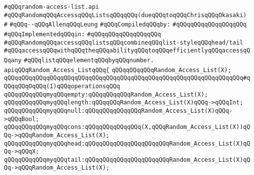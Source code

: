 \label{src/lib/src/random-access-list.api}
\verb|#qQQqrandom-access-list.api|\newline
\verb|#qQQqRandomqQQqAccessqQQqListsqQQqqQQq(dueqQQqtoqQQqChrisqQQqOkasaki)|\newline
\verb|#|\newline
\verb|#qQQq--qQQqAllenqQQqLeung|\newline
\newline
\verb|#qQQqCompiledqQQqby:|\newline
\verb|#qQQqqQQqqQQqqQQqqQQq|\newline
\newline
\verb|#qQQqImplementedqQQqin:|\newline
\verb|#qQQqqQQqqQQqqQQqqQQq|\newline
\newline
\verb|#qQQqRandomqQQqaccessqQQqlistsqQQqcombineqQQqlist-styleqQQqhead/tail|\newline
\verb|#qQQqaccessqQQqwithqQQqtheqQQqabilityqQQqtoqQQqefficientlyqQQqaccessqQQqany|\newline
\verb|#qQQqlistqQQqelementqQQqbyqQQqnumber.|\newline
\newline
\newline
\verb|apiqQQqRandom_Access_ListqQQq{|\newline
\newline
\verb|qQQqqQQqqQQqRandom_Access_List(X);|\newline
\newline
\verb|qQQqqQQqqQQqqQQqqQQqqQQqqQQqqQQqqQQqqQQqqQQqqQQqqQQqqQQqqQQqqQQqqQQq#qQQqqQQqOqQQq(1)qQQqoperationsqQQq|\newline
\verb|qQQqqQQqqQQqmyqQQqempty:qQQqqQQqqQQqRandom_Access_List(X);|\newline
\verb|qQQqqQQqqQQqmyqQQqlength:qQQqqQQqRandom_Access_List(X)qQQq->qQQqInt;|\newline
\verb|qQQqqQQqqQQqmyqQQqnull:qQQqqQQqqQQqqQQqRandom_Access_List(X)qQQq->qQQqBool;|\newline
\verb|qQQqqQQqqQQqmyqQQqcons:qQQqqQQqqQQqqQQq(X,qQQqRandom_Access_List(X))qQQq->qQQqRandom_Access_List(X);|\newline
\verb|qQQqqQQqqQQqmyqQQqhead:qQQqqQQqqQQqqQQqqQQqqQQqRandom_Access_List(X)qQQq->qQQqX;|\newline
\verb|qQQqqQQqqQQqmyqQQqtail:qQQqqQQqqQQqqQQqqQQqqQQqRandom_Access_List(X)qQQq->qQQqRandom_Access_List(X);|\newline
